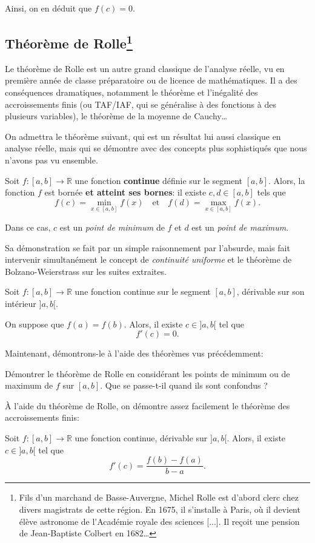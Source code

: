 \documentclass[12pt]{article}
\newcommand{\RR}{\mathbb R}
\theoremstyle{definition}
\theoremstyle{theorem}
\theoremstyle{remark}
\begin{document}
Ainsi, on en déduit que $f(c) = 0$.

\subsection*{Théorème de Rolle\footnote{Fils d'un marchand de Basse-Auvergne, Michel Rolle est d'abord clerc chez divers magistrats de cette région. En 1675, il s'installe à Paris, où il devient élève astronome de l'Académie royale des sciences [...]. Il reçoit une pension de Jean-Baptiste Colbert en 1682\ldots}}

Le théorème de Rolle est un autre grand classique de l'analyse réelle, vu en première année de classe préparatoire ou de licence de mathématiques. Il a des conséquences dramatiques, notamment le théorème et l'inégalité des accroissements finis (ou TAF/IAF, qui se généralise à des fonctions à des plusieurs variables), le théorème de la moyenne de Cauchy\ldots

On admettra le théorème suivant, qui est un résultat lui aussi classique en analyse réelle, mais qui se démontre avec des concepts plus sophistiqués que nous n'avons pas vu ensemble.

\begin{thm}
	Soit $f:[a,b]\longrightarrow\RR$ une fonction \textbf{continue} définie sur le segment $[a,b]$. Alors, la fonction $f$ est bornée \textbf{et atteint ses bornes}: il existe $c,d\in[a,b]$ tels que
	\[
	f(c) = \min_{x\in[a,b]} f(x)\quad\text{et}\quad f(d) = \max_{x\in[a,b]}f(x).
	\]
	
	Dans ce cas, $c$ est un \emph{point de minimum} de $f$ et $d$ est un \emph{point de maximum}.
\end{thm}

Sa démonstration se fait par un simple raisonnement par l'absurde, mais fait intervenir simultanément le concept de \textit{continuité uniforme} et le théorème de Bolzano-Weierstrass sur les suites extraites.

\begin{thm}[de Rolle, 1691]
Soit $f:[a,b]\longrightarrow\RR$ une fonction continue sur le segment $[a,b]$, dérivable sur son intérieur $]a,b[$.

On suppose que $f(a) = f(b)$. Alors, il existe $c\in{]a,b[}$ tel que
\[
f'(c) = 0.
\]
\end{thm}


Maintenant, démontrons-le à l'aide des théorèmes vus précédemment:

\begin{exer}
Démontrer le théorème de Rolle en considérant les points de minimum ou de maximum de $f$ sur $[a,b]$. Que se passe-t-il quand ils sont confondus ?
\end{exer}

À l'aide du théorème de Rolle, on démontre assez facilement le théorème des accroissements finis:
\begin{thm}
Soit $f:[a,b]\longrightarrow\RR$ une fonction continue, dérivable sur $]a,b[$. Alors, il existe $c\in{]a,b[}$ tel que
\[
f'(c) = \frac{f(b)-f(a)}{b-a}.
\]
\end{thm}
\end{document}
